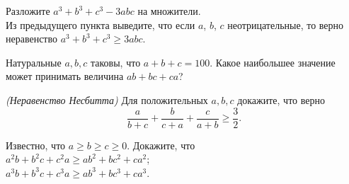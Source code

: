 


\begin{problems}

\item 
\subproblem
Разложите $a^3 + b^3 + c^3 - 3 a b c$ на множители.
\\
\subproblem
Из предыдущего пункта выведите, что если $a$, $b$, $c$ неотрицательные, то верно неравенство
$a^3 + b^3 + c^3 \geq 3abc$.

\item
Натуральные $a, b, c$ таковы, что $a + b + c = 100$.
Какое наибольшее значение может принимать величина $a b + b c + c a$?

\item
\emph{(Неравенство Несбитта)}
Для положительных $a, b, c$ докажите, что верно
\[
\frac{a}{b + c} + \frac{b}{c + a} + \frac{c}{a + b} \geq \frac{3}{2}.
\]

\item
Известно, что $a \geq b \geq c \geq 0$.
Докажите, что 
\\
\subproblem $a^2 b + b^2 c + c^2 a \geq a b^2 + b c^2 + c a^2$;
\\
\subproblem $a^3 b + b^3 c + c^3 a \geq a b^3 + b c^3 + c a^3$.

\end{problems}

